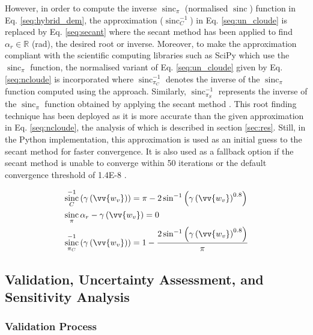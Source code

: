 \documentclass[review]{elsarticle}
\numberwithin{equation}{section}
\numberwithin{figure}{section}
\numberwithin{table}{section}
\DeclareMathOperator{\sinc}{sinc}
\begin{document}
However, in order to compute the inverse $\sinc_\pi$ (normalised $\sinc$) function in Eq. \eqref{seq:hybrid_dem}, the \cite{Cloude2010} approximation ($\sinc_C^{-1}$) in Eq. \eqref{seq:un_cloude} is replaced by Eq. \eqref{seq:secant} where the secant method \citep{Cheney2012} has been applied to find $\alpha_r \in \mathbb{R}$ (rad), the desired root or inverse. Moreover, to make the \cite{Cloude2010} approximation compliant with the scientific computing libraries such as SciPy \citep{Jones2001} which use the $\sinc_\pi$ function, the normalised variant of Eq. \eqref{seq:un_cloude} given by Eq. \eqref{seq:ncloude} is incorporated where $\sinc_{\pi_C}^{-1}$ denotes the inverse of the $\sinc_\pi$ function computed using the \cite{Cloude2010} approach. Similarly, $\sinc_{\pi_S}^{-1}$ represents the inverse of the $\sinc_\pi$ function obtained by applying the secant method \citep{Cheney2012, Jones2001}. This root finding technique has been deployed as it is more accurate than the given approximation in Eq. \eqref{seq:ncloude}, the analysis of which is described in section \ref{sec:res}. Still, in the Python implementation, this approximation is used as an initial guess to the secant method for faster convergence. It is also used as a fallback option if the secant method is unable to converge within 50 iterations or the default convergence threshold of 1.4E-8 \citep{Jones2001}.

\begin{subequations}
    \centering
    \begin{align}
        \label{seq:un_cloude}
        & \sinc_C^{-1}\left(\gamma\left(\vv{w_v}\right)\right) = \pi - 2\sin^{-1}\left(\gamma\left(\vv{w_v}\right)^{0.8}\right) \\
        \label{seq:secant}
        & \sinc_\pi\alpha_r  - \gamma\left(\vv{w_v}\right) = 0 \\
        \label{seq:ncloude}
        & \sinc_{\pi_C}^{-1}\left(\gamma\left(\vv{w_v}\right)\right) = 1 - \frac{2\sin^{-1}\left(\gamma\left(\vv{w_v}\right)^{0.8}\right)}{\pi}
    \end{align}
\end{subequations}

\subsection{Validation, Uncertainty Assessment, and Sensitivity Analysis}
\label{ssec:vus}
\subsubsection{Validation Process}
\label{sssec:val}
\end{document}
